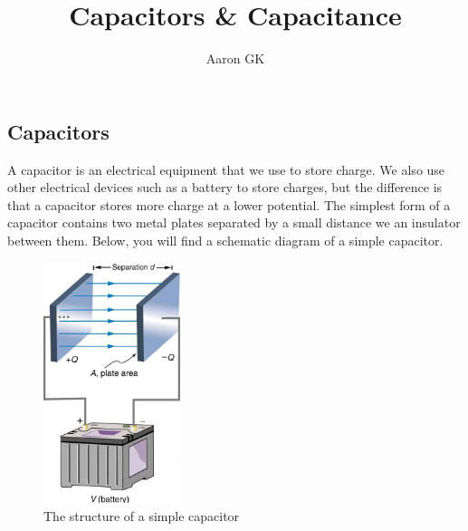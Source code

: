 \documentclass[9pt,addpoints]{exam}
\author{Aaron GK}
\begin{document}
	\title{Capacitors \& Capacitance}
	\maketitle
	\subsection*{Capacitors}
	A capacitor is an electrical equipment that we use to store charge. We also use other electrical devices such as a battery to store charges, but the difference is that a capacitor stores more charge at a lower potential. The simplest form of a capacitor contains two metal plates separated by a small distance we an insulator between them. Below, you will find a schematic diagram of a simple capacitor.
	
	\begin{figure}[htp]
		\centering
		\includegraphics[width=4cm]{structure}
		\caption{The structure of a simple capacitor}
		\label{fig:structure}
	\end{figure}
	
\end{document}
